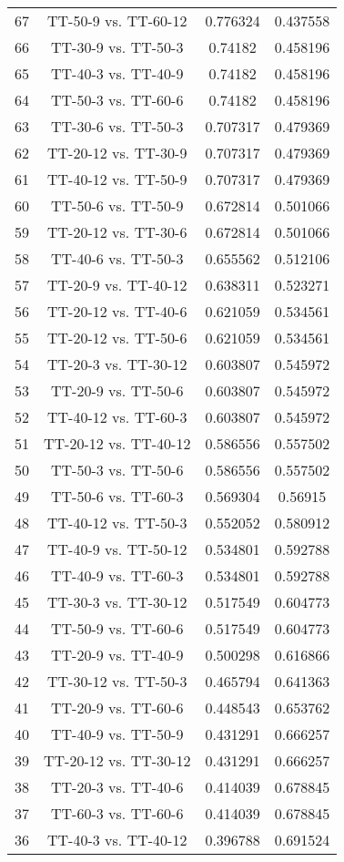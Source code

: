 \documentclass[a4paper,10pt]{article}
\begin{document}
\begin{landscape}
\begin{table}[!htp]
\begin{tabular}{cccc}
67&TT-50-9 vs. TT-60-12&0.776324&0.437558\\
66&TT-30-9 vs. TT-50-3&0.74182&0.458196\\
65&TT-40-3 vs. TT-40-9&0.74182&0.458196\\
64&TT-50-3 vs. TT-60-6&0.74182&0.458196\\
63&TT-30-6 vs. TT-50-3&0.707317&0.479369\\
62&TT-20-12 vs. TT-30-9&0.707317&0.479369\\
61&TT-40-12 vs. TT-50-9&0.707317&0.479369\\
60&TT-50-6 vs. TT-50-9&0.672814&0.501066\\
59&TT-20-12 vs. TT-30-6&0.672814&0.501066\\
58&TT-40-6 vs. TT-50-3&0.655562&0.512106\\
57&TT-20-9 vs. TT-40-12&0.638311&0.523271\\
56&TT-20-12 vs. TT-40-6&0.621059&0.534561\\
55&TT-20-12 vs. TT-50-6&0.621059&0.534561\\
54&TT-20-3 vs. TT-30-12&0.603807&0.545972\\
53&TT-20-9 vs. TT-50-6&0.603807&0.545972\\
52&TT-40-12 vs. TT-60-3&0.603807&0.545972\\
51&TT-20-12 vs. TT-40-12&0.586556&0.557502\\
50&TT-50-3 vs. TT-50-6&0.586556&0.557502\\
49&TT-50-6 vs. TT-60-3&0.569304&0.56915\\
48&TT-40-12 vs. TT-50-3&0.552052&0.580912\\
47&TT-40-9 vs. TT-50-12&0.534801&0.592788\\
46&TT-40-9 vs. TT-60-3&0.534801&0.592788\\
45&TT-30-3 vs. TT-30-12&0.517549&0.604773\\
44&TT-50-9 vs. TT-60-6&0.517549&0.604773\\
43&TT-20-9 vs. TT-40-9&0.500298&0.616866\\
42&TT-30-12 vs. TT-50-3&0.465794&0.641363\\
41&TT-20-9 vs. TT-60-6&0.448543&0.653762\\
40&TT-40-9 vs. TT-50-9&0.431291&0.666257\\
39&TT-20-12 vs. TT-30-12&0.431291&0.666257\\
38&TT-20-3 vs. TT-40-6&0.414039&0.678845\\
37&TT-60-3 vs. TT-60-6&0.414039&0.678845\\
36&TT-40-3 vs. TT-40-12&0.396788&0.691524\\

\end{tabular}
\end{table}
\end{landscape}
\end{document}
